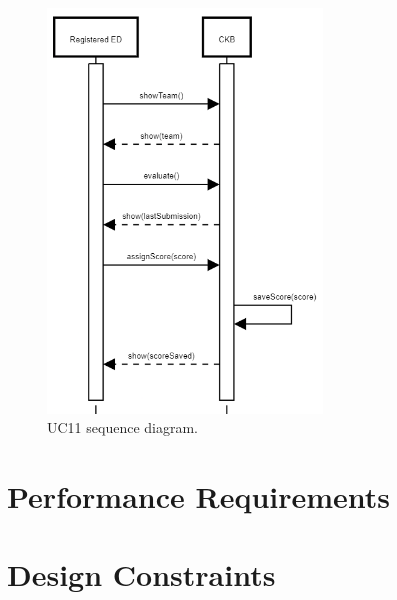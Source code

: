 \begin{center}
  \begin{figure} [H]
    \begin{center}
        \includegraphics[width=0.65\textwidth,height=\textheight,keepaspectratio]{Images/UseCaseDiagrams/UC11.png}
        \caption{UC11 sequence diagram.}
        \label{fig: UC11_sequence_diagram}
    \end{center}
  \end{figure}
\end{center}


\section{Performance Requirements}
\label{s:Performance_requirements}%

\section{Design Constraints}
\label{s:Design_constraints}%


